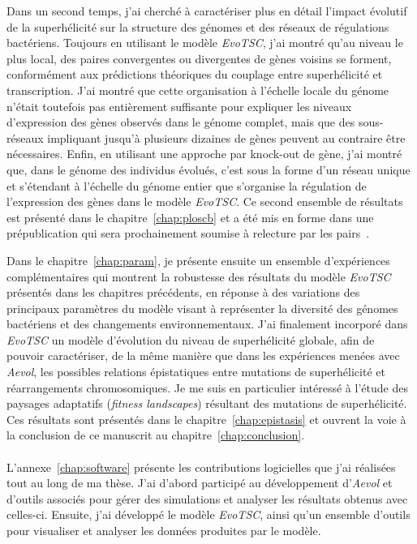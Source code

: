 Dans un second temps, j'ai cherché à caractériser plus en détail l'impact évolutif de la superhélicité sur la structure des génomes et des réseaux de régulations bactériens.
Toujours en utilisant le modèle \emph{EvoTSC}, j'ai montré qu'au niveau le plus local, des paires convergentes ou divergentes de gènes voisins se forment, conformément aux prédictions théoriques du couplage entre superhélicité et transcription.
J'ai montré que cette organisation à l'échelle locale du génome n'était toutefois pas entièrement suffisante pour expliquer les niveaux d'expression des gènes observés dans le génome complet, mais que des sous-réseaux impliquant jusqu'à plusieurs dizaines de gènes peuvent au contraire être nécessaires.
Enfin, en utilisant une approche par knock-out de gène, j'ai montré que, dans le génome des individus évolués, c'est sous la forme d'un réseau unique et s'étendant à l'échelle du génome entier que s'organise la régulation de l'expression des gènes dans le modèle \emph{EvoTSC}.
Ce second ensemble de résultats est présenté dans le chapitre~\ref{chap:ploscb} et a été mis en forme dans une prépublication qui sera prochainement soumise à relecture par les pairs~\citep{grohens2022b}.

Dans le chapitre~\ref{chap:param}, je présente ensuite un ensemble d'expériences complémentaires qui montrent la robustesse des résultats du modèle \emph{EvoTSC} présentés dans les chapitres précédents, en réponse à des variations des principaux paramètres du modèle visant à représenter la diversité des génomes bactériens et des changements environnementaux.
J'ai finalement incorporé dans \emph{EvoTSC} un modèle d'évolution du niveau de superhélicité globale, afin de pouvoir caractériser, de la même manière que dans les expériences menées avec \emph{Aevol}, les possibles relations épistatiques entre mutations de superhélicité et réarrangements chromosomiques.
Je me suis en particulier intéressé à l'étude des paysages adaptatifs (\emph{fitness landscapes}) résultant des mutations de superhélicité.
Ces résultats sont présentés dans le chapitre~\ref{chap:epistasis} et ouvrent la voie à la conclusion de ce manuscrit au chapitre~\ref{chap:conclusion}.

\paragraph{}
L'annexe~\ref{chap:software} présente les contributions logicielles que j'ai réalisées tout au long de ma thèse.
J'ai d'abord participé au développement d'\emph{Aevol} et d'outils associés pour gérer des simulations et analyser les résultats obtenus avec celles-ci.
Ensuite, j'ai développé le modèle \emph{EvoTSC}, ainsi qu'un ensemble d'outils pour visualiser et analyser les données produites par le modèle.

